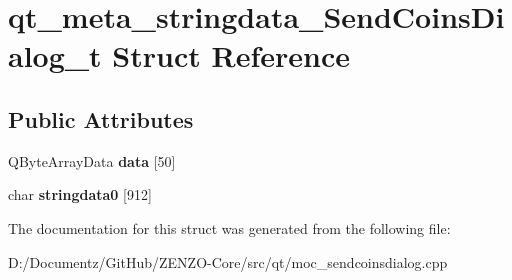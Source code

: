 \hypertarget{structqt__meta__stringdata___send_coins_dialog__t}{}\section{qt\+\_\+meta\+\_\+stringdata\+\_\+\+Send\+Coins\+Dialog\+\_\+t Struct Reference}
\label{structqt__meta__stringdata___send_coins_dialog__t}
\subsection*{Public Attributes}
\begin{DoxyCompactItemize}
\item 
\mbox{\label{structqt__meta__stringdata___send_coins_dialog__t_a024e2fe712c97682fe06c12da90a114e}} 
Q\+Byte\+Array\+Data {\bfseries data} \mbox{[}50\mbox{]}
\item 
\mbox{\label{structqt__meta__stringdata___send_coins_dialog__t_abb315bd2fbac1af6f3055fe21518f550}} 
char {\bfseries stringdata0} \mbox{[}912\mbox{]}
\end{DoxyCompactItemize}


The documentation for this struct was generated from the following file\+:\begin{DoxyCompactItemize}
\item 
D\+:/\+Documentz/\+Git\+Hub/\+Z\+E\+N\+Z\+O-\/\+Core/src/qt/moc\+\_\+sendcoinsdialog.\+cpp\end{DoxyCompactItemize}
